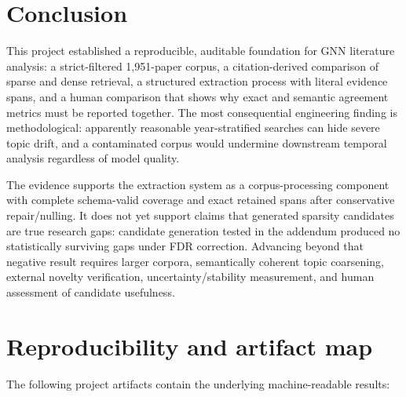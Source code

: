 \documentclass[sigconf,review,anonymous]{acmart}
\begin{document}
\section{Conclusion}
This project established a reproducible, auditable foundation for GNN literature analysis: a strict-filtered 1,951-paper corpus, a citation-derived comparison of sparse and dense retrieval, a structured extraction process with literal evidence spans, and a human comparison that shows why exact and semantic agreement metrics must be reported together. The most consequential engineering finding is methodological: apparently reasonable year-stratified searches can hide severe topic drift, and a contaminated corpus would undermine downstream temporal analysis regardless of model quality.

The evidence supports the extraction system as a corpus-processing component with complete schema-valid coverage and exact retained spans after conservative repair/nulling. It does not yet support claims that generated sparsity candidates are true research gaps: candidate generation tested in the addendum produced no statistically surviving gaps under FDR correction. Advancing beyond that negative result requires larger corpora, semantically coherent topic coarsening, external novelty verification, uncertainty/stability measurement, and human assessment of candidate usefulness.

\section*{Reproducibility and artifact map}
The following project artifacts contain the underlying machine-readable results:
\end{document}
